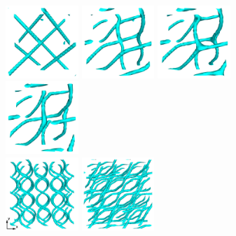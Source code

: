 \documentclass[8.5pt,twoside,twocolumn]{article}
\begin{document}
\begin{figure}[htpb]
\includegraphics[width=0.245\textwidth]{disc-xy-10k_run1115.png}
\includegraphics[width=0.245\textwidth]{disc-xy-180k_run1115.png}
\includegraphics[width=0.245\textwidth]{disc-xy-200k_run1115.png}
\includegraphics[width=0.245\textwidth]{disc-xy-210k_run1115.png}\\
\includegraphics[width=0.245\textwidth]{disc-xy-400k_run1115.png}
\includegraphics[width=0.245\textwidth]{disc-xy-700k_run1115.png}

\end{figure}
\end{document}
